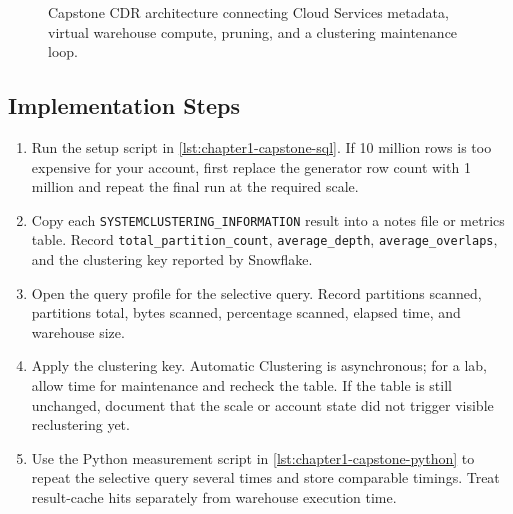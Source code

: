 \begin{figure}[H]
{%
    }
    \caption{Capstone CDR architecture connecting Cloud Services metadata, virtual warehouse compute, pruning, and a clustering maintenance loop.}
    \label{fig:chapter1-capstone-cdr-architecture}
\end{figure}

\subsection*{Implementation Steps}
\begin{enumerate}
    \item Run the setup script in \cref{lst:chapter1-capstone-sql}. If 10 million rows is too expensive for your account, first replace the generator row count with 1 million and repeat the final run at the required scale.
    \item Copy each \texttt{SYSTEM\textdollar CLUSTERING\_INFORMATION} result into a notes file or metrics table. Record \texttt{total\_partition\_count}, \texttt{average\_depth}, \texttt{average\_overlaps}, and the clustering key reported by Snowflake.
    \item Open the query profile for the selective query. Record partitions scanned, partitions total, bytes scanned, percentage scanned, elapsed time, and warehouse size.
    \item Apply the clustering key. Automatic Clustering is asynchronous; for a lab, allow time for maintenance and recheck the table. If the table is still unchanged, document that the scale or account state did not trigger visible reclustering yet.
    \item Use the Python measurement script in \cref{lst:chapter1-capstone-python} to repeat the selective query several times and store comparable timings. Treat result-cache hits separately from warehouse execution time.
\end{enumerate}

